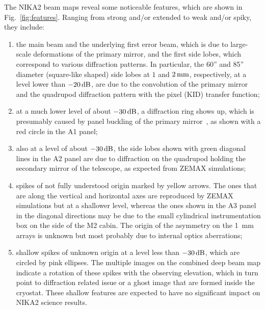 The NIKA2 beam maps reveal some noticeable features, which are
shown in Fig.~\ref{fig:features}. Ranging from strong and/or extended to
weak and/or spiky, they include:
\begin{enumerate}
\item the main beam and the underlying first error
  beam, which is due to large-scale deformations of the primary
  mirror, and the first side lobes, {\lp which correspond to various diffraction
  patterns. In particular, the 60'' and 85'' diameter (square-like shaped) side
  lobes at $1$ and $2\,\rm{mm}$, respectively, at a level lower than
  $-20\,\rm{dB}$, are due to the convolution of the primary mirror and the
  quadrupod diffraction pattern with the pixel (KID) transfer function;}
\item at a much lower level of about $-30\,\rm{dB}$, a diffraction ring shows    
up, which is presumably caused by panel buckling of the primary 
  mirror~\citep{Greve2010}, as shown with a red circle in the A1 panel;
\item also at a level of about $-30\,\rm{dB}$, the side lobes shown with green
  diagonal lines in the A2 panel are due to diffraction on the
  quadrupod holding the secondary mirror of the telescope, as expected
  from ZEMAX simulations;  
\item spikes of not fully understood origin marked by yellow
  arrows. The ones that are along the vertical and
  horizontal axes are reproduced by ZEMAX simulations but at a 
  shallower level, whereas the ones shown in the A3 panel in the
  diagonal directions may be due to the small cylindrical
  instrumentation box on the side of the M2 cabin. The origin of the
  asymmetry on the 1~mm arrays is unknown but most probably due to
  internal optics aberrations;
\item shallow spikes of unknown origin at a level less than $-30\,\rm{dB}$, which are circled by pink
  ellipses. The multiple images on the combined deep beam map indicate
  a rotation of these spikes with the observing elevation, which in
  turn point to diffraction related issue or a ghost image that are
  formed inside the cryostat. These shallow features are expected to
  have no significant impact on NIKA2 science results.
\end{enumerate}

